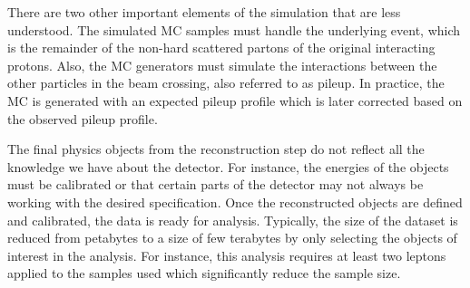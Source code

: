 There are two other important elements of the simulation that are less understood. The simulated MC samples must handle the underlying event, which is the remainder of the non-hard scattered partons of 
the original interacting protons. Also, the MC generators must simulate the interactions between the other particles in the beam crossing, also referred to as pileup. In practice, 
the MC is generated with an expected pileup profile which is later corrected based on the observed pileup profile.


The final physics objects from the reconstruction step do not reflect all the knowledge we have about the detector. For instance, the energies of the objects must be calibrated
or that certain parts of the detector may not always be working with the desired specification. 
 Once the reconstructed objects are defined and calibrated, the data is ready for analysis. Typically, the size of the dataset is reduced from petabytes to a size of few terabytes
  by only selecting the objects of interest in the analysis. For instance, this analysis requires at least two leptons applied to the samples used which significantly reduce the sample size.
